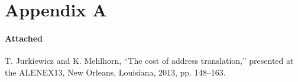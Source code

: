 \section*{Appendix A}
  \paragraph{Attached}
  
  T. Jurkiewicz and K. Mehlhorn, “The cost of address translation,” presented
  at the ALENEX13, New Orleans, Louisiana, 2013, pp. 148–163.
  
  